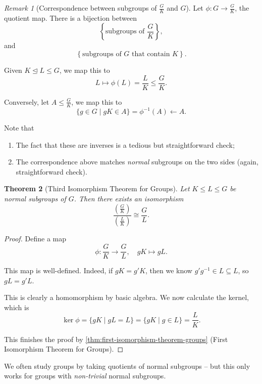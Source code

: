 \documentclass{article}
\newtheorem{theorem}{Theorem}[section]
\theoremstyle{definition}
\theoremstyle{remark}
\newtheorem{remark}[theorem]{Remark}
\newcommand{\pqty}[1]{\left(#1\right)}
\newcommand{\Bqty}[1]{\left\{#1\right\}}
\newcommand{\set}[2]{\{#1\mid #2\}}
\newcommand{\flatfrac}[2]{\frac{#1}{#2}}
\newcommand{\functiondomain}[3]{#1:#2\to #3}
\newcommand{\function}[5]{#1:#2\to #3,\quad #4\mapsto #5}
\newcommand{\inverse}{^{-1}}
\newcommand{\isomorphic}{\cong}
\newcommand{\normalsub}{\trianglelefteq}
\newcommand{\subgroup}{\leq}
\newcommand{\mapsfrom}{\leftarrow}
\begin{document}
\begin{remark}[Correspondence between subgroups of \(\flatfrac{G}{K}\) and \(G\)]
    Let \(\functiondomain{\phi}{G}{\flatfrac{G}{K}}\), the quotient map. There is a bijection between
    \[
        \Bqty{\text{subgroups of }\flatfrac{G}{K}},
    \]
    and
    \[
        \Bqty{\text{subgroups of }G\text{ that contain }K}.
    \]

    Given \(K \normalsub L \subgroup G\), we map this to
    \[
        L \mapsto \phi\pqty{L} = \flatfrac{L}{K} \subgroup \flatfrac{G}{K}.
    \]

    Conversely, let \(A \subgroup \flatfrac{G}{K}\), we map this to
    \[
        \set{g \in G}{gK \in A} = \phi\inverse\pqty{A} \mapsfrom A.
    \]

    Note that
    \begin{enumerate}
        \item The fact that these are inverses is a tedious but straightforward check;
        \item The correspondence above matches \emph{normal} subgroups on the two sides (again, straightforward check).
    \end{enumerate}
\end{remark}

\begin{theorem}[Third Isomorphism Theorem for Groups]
    \label{thm:third-isomorphism-theorem-groups}%
    Let \(K \subgroup L \subgroup G\) be normal subgroups of \(G\). Then there exists an isomorphism
    \[
        \flatfrac{\pqty{\flatfrac{G}{K}}}{\pqty{\flatfrac{L}{K}}} \isomorphic \flatfrac{G}{L}.
    \]
\end{theorem}

\begin{proof}
    Define a map
    \[
        \function{\phi}{\flatfrac{G}{K}}{\flatfrac{G}{L}}{gK}{gL}.
    \]

    This map is well-defined. Indeed, if \(gK = g'K\), then we know \(g' g\inverse \in L \subseteq L\), so \(gL = g'L\).

    This is clearly a homomorphism by basic algebra. We now calculate the kernel, which is
    \[
        \ker \phi = \set{gK}{gL = L} = \set{gK}{g \in L} = \flatfrac{L}{K}.
    \]

    This finishes the proof by \autoref{thm:first-isomorphism-theorem-groups} (First Isomorphism Theorem for Groups).
\end{proof}

We often study groups by taking quotients of normal subgroups -- but this only works for groups with \emph{non-trivial} normal subgroups.
\end{document}
